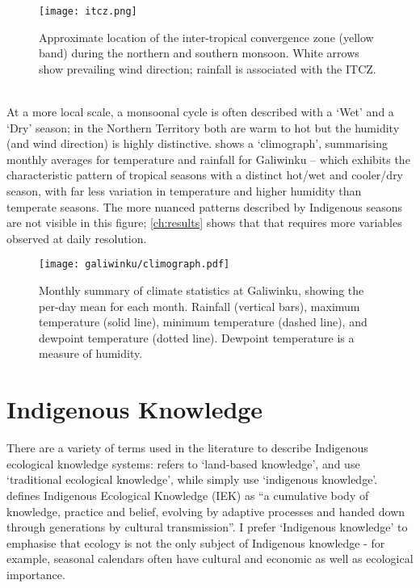 \begin{figure}[h]
    \centering
    \texttt{[image: itcz.png]}
    \caption[ITCZ showing northern and southern monsoon]{
        Approximate location of the inter-tropical convergence zone
        (yellow band) during the northern and southern monsoon.
        White arrows show prevailing wind direction; rainfall is
        associated with the ITCZ.  \citep[image:][]{boos2014}}
    \label{fig:itcz-india-aus}
\end{figure}

~\\


At a more local scale, a monsoonal cycle is often described with a `Wet'
and a `Dry' season; in the Northern Territory both are warm to hot but
the humidity (and wind direction) is highly distinctive.
%
 shows a `climograph', summarising monthly
averages for temperature and rainfall for Galiwinku -- which exhibits the
characteristic pattern of tropical seasons with a distinct hot/wet and
cooler/dry season, with far less variation in temperature and higher
humidity than temperate seasons.
%
The more nuanced patterns described by Indigenous seasons are not visible
in this figure; \cref{ch:results} shows that that requires more variables
observed at daily resolution.

\begin{figure}[h]
    \centering
    \texttt{[image: galiwinku/climograph.pdf]}
    \caption[Monthly Climograph for Galiwinku]{
        Monthly summary of climate statistics at Galiwinku, showing the per-day
        mean for each month.  Rainfall (vertical bars), maximum temperature
        (solid line), minimum temperature (dashed line), and  dewpoint
        temperature (dotted line).  Dewpoint temperature is a measure of humidity.}
    \label{fig:galiwinku-climograph}
\end{figure}




\section{Indigenous Knowledge}
\label{sec:lit-iek}

There are a variety of terms used in the literature to describe Indigenous
ecological knowledge systems:  \citet{clarke2009} refers to `land-based knowledge',
\citet{petheram2010} and \citet{turner2009} use `traditional ecological
knowledge', while \citet{cochran2015} simply use `indigenous knowledge'.
\citet{berkes2012} defines Indigenous Ecological Knowledge (IEK) as ``a cumulative
body of knowledge, practice and belief, evolving by adaptive processes and
handed down through generations by cultural transmission''.  I prefer
`Indigenous knowledge' to emphasise that ecology is not the only subject of
Indigenous knowledge - for example, seasonal calendars often have cultural and
economic as well as ecological importance.

